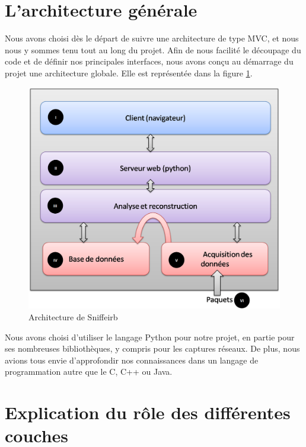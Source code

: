 

\section{L'architecture générale}

Nous avons choisi dès le départ de suivre une architecture de type MVC, et nous nous y sommes tenu tout au long du projet. Afin de nous facilité le découpage du code et de définir nos principales interfaces, nous
avons conçu au démarrage du projet une architecture globale. Elle est représentée dans la figure \ref{Architecture}.

\begin{figure}[h!]
\centering
\includegraphics[scale=0.5]{Archi.png}
\caption{Architecture de Sniffeirb}
\label{Architecture}
\end{figure}

Nous avons choisi d'utiliser le langage Python pour notre projet, en partie pour ses nombreuses bibliothèques, y compris pour les captures réseaux. De plus, nous avions tous envie d'approfondir nos connaissances dans 
un langage de programmation autre que le C, C++ ou Java.

\section{Explication du rôle des différentes couches}

